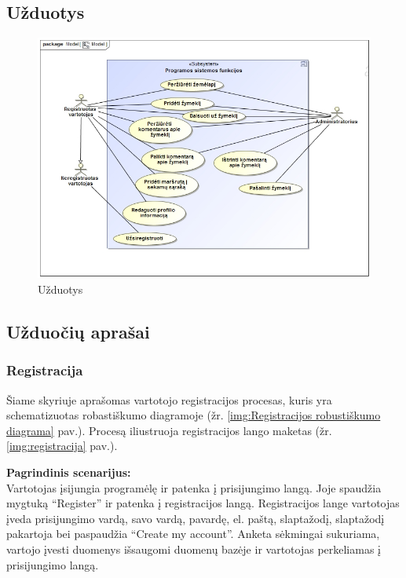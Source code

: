 \documentclass{VUMIFPSkursinis}
\begin{document}
\subsection{Užduotys}
	\begin{figure}[H]
				\centering
				\includegraphics[scale=0.5]{img/uzduotys}
				\caption{Užduotys}
				\label{img:uzduotys}
			\end{figure}

\subsection{Užduočių aprašai}
\subsubsection{Registracija}
	Šiame skyriuje aprašomas vartotojo registracijos procesas, kuris yra schematizuotas robastiškumo diagramoje (žr. \ref{img:Registracijos robustiškumo diagrama} pav.). 
	Procesą iliustruoja registracijos lango maketas (žr. \ref{img:registracija} pav.).

	\textbf{Pagrindinis scenarijus:}\\
	Vartotojas įsijungia programėlę ir patenka į prisijungimo langą. Joje spaudžia mygtuką “Register” ir patenka į registracijos langą. 
	Registracijos lange vartotojas įveda prisijungimo vardą, savo vardą, pavardę, el. paštą, slaptažodį, slaptažodį pakartoja bei paspaudžia 
	“Create my account”. Anketa sėkmingai sukuriama, vartojo įvesti duomenys išsaugomi duomenų bazėje ir vartotojas perkeliamas į prisijungimo langą.
\end{document}
